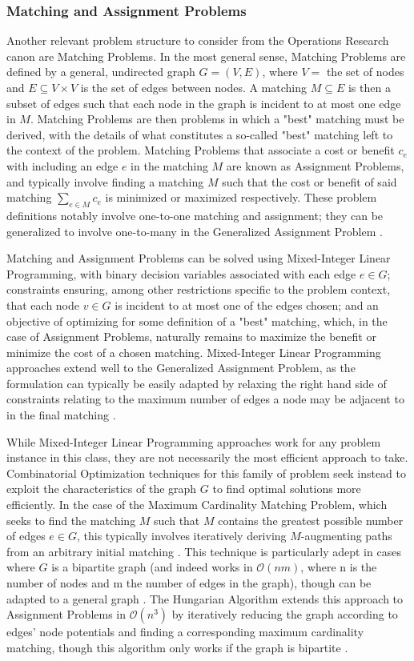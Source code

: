 \documentclass[11pt,twoside]{article}
\numberwithin{Theorem}{section}
\numberwithin{Definition}{section}
\numberwithin{Lemma}{section}
\numberwithin{Algorithm}{section}
\numberwithin{equation}{section}
\begin{document}
\subsubsection{Matching and Assignment Problems}
Another relevant problem structure to consider from the Operations Research canon are Matching Problems. In the most general sense, Matching Problems are defined by a general, undirected graph $G = (V, E)$, where $V =$ the set of nodes and $E \subseteq V \times V$ is the set of edges between nodes. A matching $M \subseteq E$ is then a subset of edges such that each node in the graph is incident to at most one edge in $M$. Matching Problems are then problems in which a "best" matching must be derived, with the details of what constitutes a so-called "best" matching left to the context of the problem. Matching Problems that associate a cost or benefit $c_e$ with including an edge $e$ in the matching $M$ are known as Assignment Problems, and typically involve finding a matching $M$ such that the cost or benefit of said matching $\sum\nolimits_{e \in M} c_e$ is minimized or maximized respectively. These problem definitions notably involve one-to-one matching and assignment; they can be generalized to involve one-to-many in the Generalized Assignment Problem \cite{burkard}.

Matching and Assignment Problems can be solved using Mixed-Integer Linear Programming, with binary decision variables associated with each edge $e \in G$; constraints ensuring, among other restrictions specific to the problem context, that each node $v \in G$ is incident to at most one of the edges chosen; and an objective of optimizing for some definition of a "best" matching, which, in the case of Assignment Problems, naturally remains to maximize the benefit or minimize the cost of a chosen matching. Mixed-Integer Linear Programming approaches extend well to the Generalized Assignment Problem, as the formulation can typically be easily adapted by relaxing the right hand side of constraints relating to the maximum number of edges a node may be adjacent to in the final matching \cite{burkard}.

While Mixed-Integer Linear Programming approaches work for any problem instance in this class, they are not necessarily the most efficient approach to take. Combinatorial Optimization techniques for this family of problem seek instead to exploit the characteristics of the graph $G$ to find optimal solutions more efficiently. In the case of the Maximum Cardinality Matching Problem, which seeks to find the matching $M$ such that $M$ contains the greatest possible number of edges $e \in G$, this typically involves iteratively deriving $M$-augmenting paths from an arbitrary initial matching \cite{burkard}. This technique is particularly adept in cases where $G$ is a bipartite graph (and indeed works in $\mathcal{O}(nm)$, where n is the number of nodes and m the number of edges in the graph), though can be adapted to a general graph \cite{Edmonds_1965}. The Hungarian Algorithm extends this approach to Assignment Problems in $\mathcal{O}(n^3)$ by iteratively reducing the graph according to edges' node potentials and finding a corresponding maximum cardinality matching, though this algorithm only works if the graph is bipartite \cite{hungary, munkres}.
\end{document}
